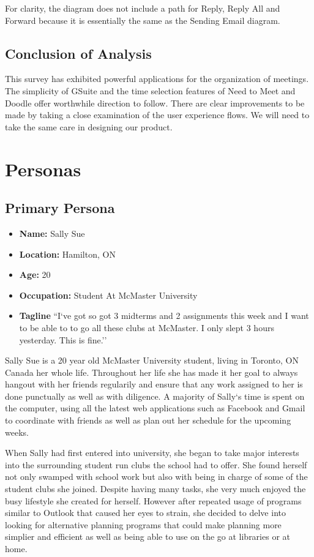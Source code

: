 \documentclass{sigchi}
\begin{document}
For clarity, the diagram does not include a path for Reply, Reply All and Forward because it is essentially the same as the Sending Email diagram.

\subsection{Conclusion of Analysis}

This survey has exhibited powerful applications for the organization of meetings.
The simplicity of GSuite and the time selection features of Need to Meet and Doodle offer worthwhile direction to follow.
There are clear improvements to be made by taking a close examination of the user experience flows.
We will need to take the same care in designing our product.


\section{Personas}

\subsection{Primary Persona}
\begin{itemize}
	\item \textbf{Name:} Sally Sue
	\item \textbf{Location:} Hamilton, ON
	\item \textbf{Age:} 20
	\item \textbf{Occupation:} Student At McMaster University
	\item \textbf{Tagline} ``I`ve got so got 3 midterms and 2 assignments this week and I want to be able to to go all these clubs at McMaster. I only slept 3 hours yesterday. This is fine.''
\end{itemize}

		Sally Sue is a 20 year old McMaster University student, living in Toronto, ON Canada her whole life. Throughout her life she has made it her goal to always hangout with her friends regularily and ensure that any work assigned to her is done punctually as well as with diligence. A majority of Sally`s time is spent on the computer, using all the latest web applications such as Facebook and Gmail to coordinate with friends as well as plan out her schedule for the upcoming weeks.

		When Sally had first entered into university, she began to take major interests into the surrounding student run clubs the school had to offer. She found herself not only swamped with school work but also with being in charge of some of the student clubs she joined. Despite having many tasks, she very much enjoyed the busy lifestyle she created for herself. However after repeated usage of programs similar to Outlook that caused her eyes to strain, she decided to delve into looking for alternative planning programs that could make planning more simplier and efficient as well as being able to use on the go at libraries or at home.
\end{document}
